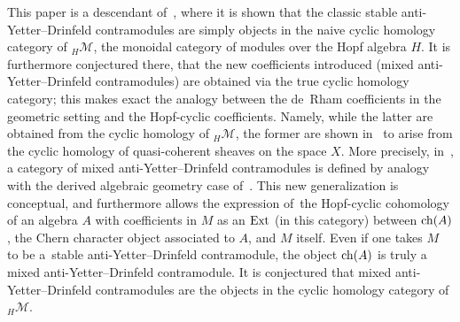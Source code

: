 \documentclass[10pt,a4paper]{amsart}
\numberwithin{equation}{section}
\newcommand{\hmod}{{_H\mathcal{M}}}
\begin{document}
This paper is a descendant of~\cite{chern}, where it is shown that the classic stable anti-Yetter--Drinfeld contramodules are simply objects in the naive cyclic homology category of $\hmod$, the monoidal category of modules over the Hopf algebra $H$. It is furthermore conjectured there, that the new coefficients introduced (mixed anti-Yetter--Drinfeld contramodules) are obtained via the true cyclic homology category; this makes exact the analogy between the de~Rham coefficients in the geometric setting and the Hopf-cyclic coefficients. Namely, while the latter are obtained from the cyclic homology of $\hmod$, the former are shown in~\cite{it} to arise from the cyclic homology of quasi-coherent sheaves on the space $X$. More precisely, in~\cite{chern}, a category of mixed anti-Yetter--Drinfeld contramodules is defined by analogy with the derived algebraic geometry case of~\cite{it}. This new generalization is conceptual, and furthermore allows the expression of~the Hopf-cyclic cohomology of an algebra $A$ with coefficients in $M$ as an ${\rm Ext}$ (in this category) between $\mathop{\rm ch}(A)$, the Chern character object associated to $A$, and $M$ itself. Even if one takes $M$ to be a~stable anti-Yetter--Drinfeld contramodule, the object $\mathop{\rm ch}(A)$ is truly a mixed anti-Yetter--Drinfeld contramodule. It is conjectured that mixed anti-Yetter--Drinfeld contramodules are the objects in the cyclic homology category of $\hmod$.
\end{document}
